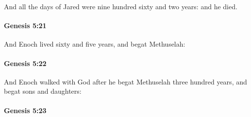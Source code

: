 			And all the days of Jared were nine hundred sixty and two years: and he died.


		\paragraph{Genesis 5:21} %
			\label{GENESIS-5-21}

			And Enoch lived sixty and five years, and begat Methuselah:


		\paragraph{Genesis 5:22} %
			\label{GENESIS-5-22}

			And Enoch walked with God after he begat Methuselah three hundred years, and begat sons and daughters:


		\paragraph{Genesis 5:23} %
			\label{GENESIS-5-23}

